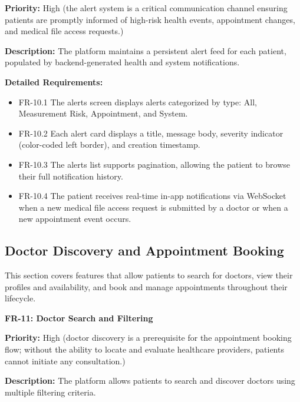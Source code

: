 \textbf{Priority:} High (the alert system is a critical communication channel ensuring patients are promptly informed of high-risk health events, appointment changes, and medical file access requests.)

\textbf{Description:} The platform maintains a persistent alert feed for each patient,
populated by backend-generated health and system notifications.

\textbf{Detailed Requirements:}
\begin{itemize}
    \item FR-10.1 \; The alerts screen displays alerts categorized by type: All,
    Measurement Risk, Appointment, and System.
    \item FR-10.2 \; Each alert card displays a title, message body, severity indicator
    (color-coded left border), and creation timestamp.
    \item FR-10.3 \; The alerts list supports pagination, allowing the patient to browse
    their full notification history.
    \item FR-10.4 \; The patient receives real-time in-app notifications via WebSocket
    when a new medical file access request is submitted by a doctor or when a new
    appointment event occurs.
\end{itemize}

\subsection{Doctor Discovery and Appointment Booking}

This section covers features that allow patients to search for doctors, view their
profiles and availability, and book and manage appointments throughout their lifecycle.

\textbf{FR-11: Doctor Search and Filtering}

\textbf{Priority:} High (doctor discovery is a prerequisite for the appointment booking flow; without the ability to locate and evaluate healthcare providers, patients cannot initiate any consultation.)

\textbf{Description:} The platform allows patients to search and discover doctors using
multiple filtering criteria.

